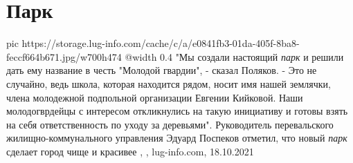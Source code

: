  
 
 
 
 
\chapter{Парк}

\ifcmt
  pic https://storage.lug-info.com/cache/c/a/e0841fb3-01da-405f-8ba8-feccf664b671.jpg/w700h474
  @width 0.4
\fi
"Мы создали настоящий \emph{парк} и решили дать ему название в честь "Молодой
гвардии", - сказал Поляков. - Это не случайно, ведь школа, которая находится
рядом, носит имя нашей землячки, члена молодежной подпольной организации
Евгении Кийковой. Наши молодогврдейцы с интересом откликнулись на такую
инициативу и готовы взять на себя ответственность по уходу за деревьями".
Руководитель перевальского жилищно-коммунального управления Эдуард Поспеков
отметил, что новый \emph{парк} сделает город чище и красивее
, , lug-info.com, 18.10.2021
